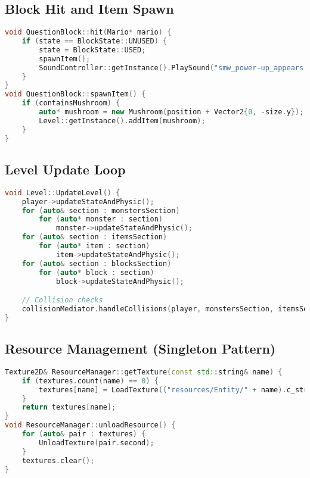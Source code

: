 \subsection*{Block Hit and Item Spawn}
\begin{lstlisting}[language=C++, caption={Question Block Hit and Item Spawn}]
void QuestionBlock::hit(Mario* mario) {
    if (state == BlockState::UNUSED) {
        state = BlockState::USED;
        spawnItem();
        SoundController::getInstance().PlaySound("smw_power-up_appears.wav");
    }
}
void QuestionBlock::spawnItem() {
    if (containsMushroom) {
        auto* mushroom = new Mushroom(position + Vector2{0, -size.y});
        Level::getInstance().addItem(mushroom);
    }
}
\end{lstlisting}

\subsection*{Level Update Loop}
\begin{lstlisting}[language=C++, caption={Level Update and Collision Handling}]
void Level::UpdateLevel() {
    player->updateStateAndPhysic();
    for (auto& section : monstersSection)
        for (auto* monster : section)
            monster->updateStateAndPhysic();
    for (auto& section : itemsSection)
        for (auto* item : section)
            item->updateStateAndPhysic();
    for (auto& section : blocksSection)
        for (auto* block : section)
            block->updateStateAndPhysic();

    // Collision checks
    collisionMediator.handleCollisions(player, monstersSection, itemsSection, blocksSection);
}
\end{lstlisting}

\subsection*{Resource Management (Singleton Pattern)}
\begin{lstlisting}[language=C++, caption={ResourceManager Singleton Usage}]
Texture2D& ResourceManager::getTexture(const std::string& name) {
    if (textures.count(name) == 0) {
        textures[name] = LoadTexture(("resources/Entity/" + name).c_str());
    }
    return textures[name];
}
void ResourceManager::unloadResource() {
    for (auto& pair : textures) {
        UnloadTexture(pair.second);
    }
    textures.clear();
}
\end{lstlisting}